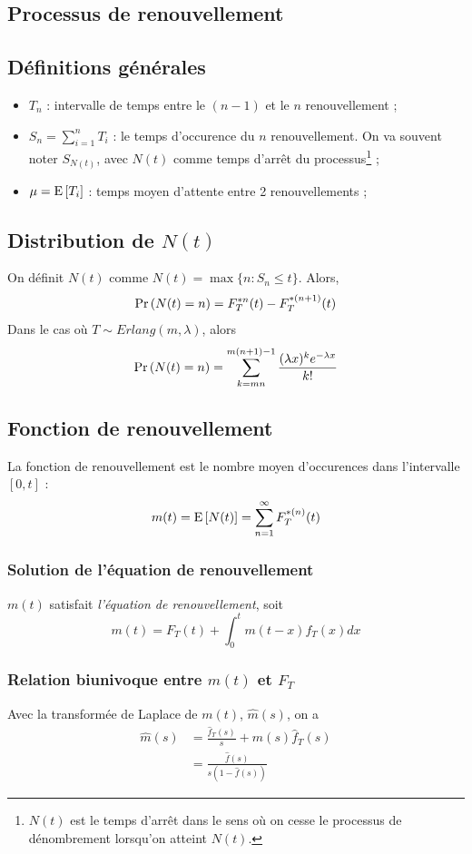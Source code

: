 \documentclass[10pt, french, landscape]{article}
\begin{document}
\begin{multicols*}{3}
\section{Processus de renouvellement}
\subsection*{Définitions générales}
\begin{itemize}
\item $T_n$ : intervalle de temps entre le $(n-1)$ et le $n$ renouvellement ;
\item $S_n = \sum_{i=1}^{n} T_i$ : le temps d'occurence du $n$ renouvellement. On va souvent noter $S_{N(t)}$, avec $N(t)$ comme temps d'arrêt du processus\footnote{$N(t)$ est le temps d'arrêt dans le sens où on cesse le processus de dénombrement lorsqu'on atteint $N(t)$.} ;

\item $\mu = \mathrm{E} \left[ T_i \right]$ : temps moyen d'attente entre 2 renouvellements ;
\end{itemize}

\subsection*{Distribution de $N(t)$}
On définit $N(t)$ comme $N(t) = \max \{ n : S_n \leq t \}$. Alors,
\begin{align*}
\Pr \left( N(t) = n \right) = F_T^{\ast n}(t) - F_T^{\ast(n+1)}(t)
\end{align*}
Dans le cas où $T \sim Erlang(m, \lambda)$, alors
\[\Pr \left( N(t) = n \right)  = \sum_{k=mn}^{m(n+1) - 1} \frac{(\lambda x)^k e^{-\lambda x}}{k!} \]

\subsection*{Fonction de renouvellement}
La fonction de renouvellement est le nombre moyen d'occurences dans l'intervalle $[0,t]$  :
\[m(t) = \mathrm{E} \left[ N(t) \right] = \sum_{n=1}^{\infty} F_T^{\ast(n)}(t)  \]

\subsubsection*{Solution de l'équation de renouvellement}
$m(t)$ satisfait \emph{l'équation de renouvellement}, soit
\[m(t) = F_T(t) + \int_{0}^{t} m(t-x) f_T(x) dx  \]

\subsubsection*{Relation biunivoque entre $m(t)$ et $F_T$}
Avec la transformée de Laplace de $m(t)$, $\hat{m}(s)$, on a
\begin{align*}
\hat{m}(s) &  = \frac{\hat{f}_T(s)}{s} + \hat{m}(s) \hat{f}_T(s) \\
& = \frac{\hat{f}(s)}{s\left(1 - \hat{f}(s)    \right)}
\end{align*}



\end{multicols*}
\end{document}
